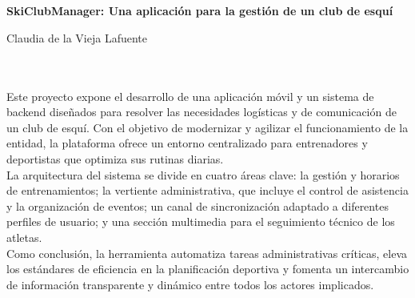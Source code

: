 \chapter*{}






\cleardoublepage
\thispagestyle{empty}

\begin{center}
{\large\bfseries SkiClubManager: Una aplicación para la gestión de un club de esquí}\\
\end{center}
\begin{center}
Claudia de la Vieja Lafuente\\
\end{center}

\\

\vspace{0.7cm}
\\

Este proyecto expone el desarrollo de una aplicación móvil y un sistema de backend diseñados para resolver las necesidades logísticas y de comunicación de un club de esquí. Con el objetivo de modernizar y agilizar el funcionamiento de la entidad, la plataforma ofrece un entorno centralizado para entrenadores y deportistas que optimiza sus rutinas diarias.\\

La arquitectura del sistema se divide en cuatro áreas clave: la gestión y horarios de entrenamientos; la vertiente administrativa, que incluye el control de asistencia y la organización de eventos; un canal de sincronización adaptado a diferentes perfiles de usuario; y una sección multimedia para el seguimiento técnico de los atletas.\\

Como conclusión, la herramienta automatiza tareas administrativas críticas, eleva los estándares de eficiencia en la planificación deportiva y fomenta un intercambio de información transparente y dinámico entre todos los actores implicados.
\cleardoublepage


\thispagestyle{empty}

